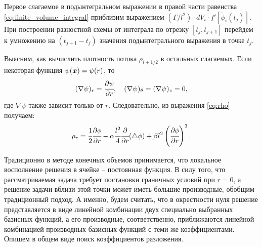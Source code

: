 Первое слагаемое в подынтегральном выражении в правой части равенства \eqref{eq:finite_volume_integral} приблизим выражением $(\Gamma/l^2) \cdot dV_i \cdot f'[\widetilde{\phi}_i(t_j)]$. При построении разностной схемы от интеграла по отрезку $[t_j, t_{j + 1}]$ перейдем к умножению на $(t_{j + 1} - t_j)$ значения подынтегрального выражения в точке $t_j$.

Выясним, как вычислить плотность потока $\rho_{i \pm 1/2}$ в остальных слагаемых. Если некоторая функция $\psi({\boldsymbol{x}}) = \psi(r)$, то
$$(\nabla \psi)_r = \cfrac{\partial \psi}{\partial r}, \quad (\nabla \psi)_\theta = (\nabla \psi)_z = 0 {\text{,}}$$
где $\nabla \psi$ также зависит только от $r$. Следовательно, из выражения \eqref{eq:rho} получаем:
\begin{equation}
    \rho_r = \cfrac{1}{2} \cfrac{\partial \phi}{\partial r} - \alpha \cfrac{l^2}{4} \cfrac{\partial}{\partial r} (\triangle \phi) + \beta l^2 \left( \cfrac{\partial \phi}{\partial r} \right)^3 {\text{.}}
    \label{eq:finite_volumes_density}
\end{equation}

Традиционно в методе конечных объемов принимается, что локальное восполнение решения в ячейке -- постоянная функция. В силу того, что рассматриваемая задача требует постановки граничных условий при $r = 0$, а решение задачи вблизи этой точки может иметь большие производные, обобщим традиционный подход. А именно, будем считать, что в окрестности нуля решение представляется в виде линейной комбинации двух специально выбранных базисных функций, а его производные, соответственно, приближаются линейной комбинацией производных базисных функций с теми же коэффициентами. Опишем в общем виде поиск коэффициентов разложения.

